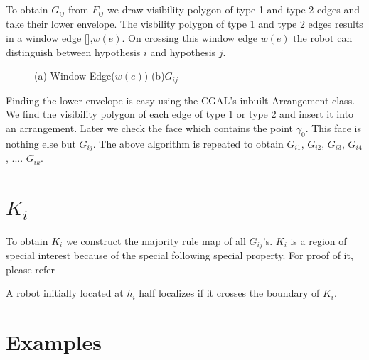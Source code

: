 To obtain $G_{ij}$ from $F_{ij}$ we draw visibility polygon of type 1 and type 2 edges and take their lower envelope. The visbility
polygon of type 1 and type 2 edges results in a window edge [\cite{key6}],$w(e)$. On crossing this window edge $w(e)$
the robot can distinguish between hypothesis $i$ and hypothesis $j$.

\begin{figure}[h]
\begin{center}
\caption{\label{fig:Construction}(a) Window Edge($w(e)$) (b)$G_{ij}$}
\end{center}
\end{figure}

Finding the lower envelope is easy using the CGAL's inbuilt Arrangement class. We find the visibility polygon of each edge of type 1
or type 2 and insert it into an arrangement. Later we check the face which contains the point $\gamma_{0}$. This face is nothing else
but $G_{ij}$.
The above algorithm is repeated to obtain $G_{i1}$, $G_{i2}$, $G_{i3}$, $G_{i4}$, .... $G_{ik}$.

\section{$K_{i}$}
To obtain $K_{i}$ we construct the 
majority rule map of all $G_{ij}$'s. $K_{i}$ is a region of special interest because of the special following special property. For 
proof of it, please refer \cite{key1}
\begin{remark} 
 A robot initially located at $h_{i}$ half localizes if it crosses the boundary of $K_{i}$.
\end{remark}

\section{Examples}

